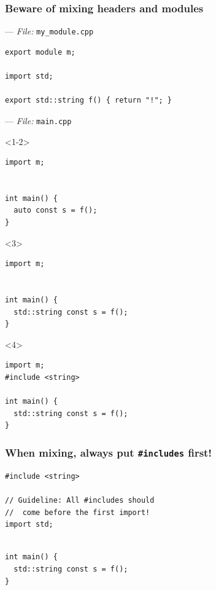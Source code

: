 \documentclass[aspectratio=169]{beamer}
\newif\iftransitions
\newcommand{\cpause}{\iftransitions \pause \fi}
\begin{document}
\begin{frame}[fragile]
  \frametitle{Beware of mixing headers and modules}
  --- \textit{File:} \texttt{my\_module.cpp}
  \begin{lstlisting}[style=cpp20]
export module m;

import std;

export std::string f() { return "!"; }
  \end{lstlisting}
  \cpause
  --- \textit{File:} \texttt{main.cpp}
  \begin{onlyenv}<1-2>
  \begin{lstlisting}[style=cpp20]
import m;


int main() {
  auto const s = f();
}
  \end{lstlisting}
  \end{onlyenv}
  \begin{onlyenv}<3>
  \begin{lstlisting}[style=cpp20]
import m;


int main() {
  std::string const s = f();
}
  \end{lstlisting}
  \end{onlyenv}
  \begin{onlyenv}<4>
  \begin{lstlisting}[style=cpp20]
import m;
#include <string>

int main() {
  std::string const s = f();
}
  \end{lstlisting}
  \end{onlyenv}

\end{frame}

\begin{frame}[fragile]
  \frametitle{When mixing, always put \texttt{\#includes} first!}

  \begin{lstlisting}[style=cpp20]
#include <string>

// Guideline: All #includes should
//  come before the first import!
import std;
  \end{lstlisting}

  \begin{lstlisting}[style=cpp20]

int main() {
  std::string const s = f();
}
  \end{lstlisting}
\end{frame}
\end{document}
